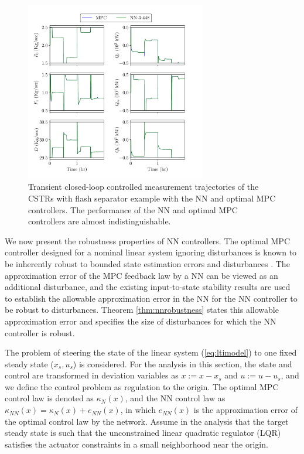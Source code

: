\documentclass[preprint,5p, twocolumn, authoryear]{elsarticle}
\begin{document}
\begin{figure}[!h]
    \centering
	\includegraphics[page=2, width=0.7\textwidth,
		height=0.5\textheight]{cstrs_comparision_plots.pdf} \caption{Transient
		closed-loop controlled measurement trajectories of the CSTRs with flash
		separator example with the NN and optimal MPC controllers. The
		performance of the NN and optimal MPC controllers are almost
		indistinguishable.}
		\label{fig:cl_cstrs_outputs}
\end{figure}

We now present the robustness properties of NN controllers. The optimal MPC
controller designed for a nominal linear system ignoring disturbances is known
to be inherently robust to bounded state estimation errors and disturbances
\citep*{heath:wills:2005, pannocchia:rawlings:wright:2011}. The approximation
error of the MPC feedback law by a NN can be viewed as an additional
disturbance, and the existing input-to-state stability results
\citep*{sontag:wang:1995} are used to establish the allowable approximation
error in the NN for the NN controller to be robust to disturbances. Theorem
\ref{thm:nnrobustness} states this allowable approximation error and specifies
the size of disturbances for which the NN controller is robust.

The problem of steering the state of the linear system (\ref{eq:ltimodel}) to
one fixed steady state ($x_s, u_s$) is considered. For the analysis in this
section, the state and control are transformed in deviation variables as $x := x
- x_s$ and $u := u -u_s$, and we define the control problem as regulation to the
origin. The optimal MPC control law is denoted as $\kappa_N(x)$, and the NN
control law as $\kappa_{NN}(x) = \kappa_N(x) + e_{NN}(x)$, in which $e_{NN}(x)$
is the approximation error of the optimal control law by the network. Assume in
the analysis that the target steady state is such that the unconstrained linear
quadratic regulator (LQR) satisfies the actuator constraints in a small
neighborhood near the origin. 
\end{document}
